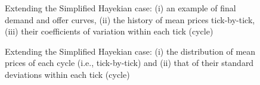 \documentclass[10pt]{report}
\begin{document}
\begin{appendices}
\begin{figure}[H]
\begin{center}
\caption{Extending the Simplified Hayekian case: (i) an example of final demand and offer curves, (ii) the history of mean prices tick-by-tick, (iii) their coefficients of variation within each tick (cycle)}
\label{output_3_2B2.png}
\end{center}
\end{figure}

\begin{figure}[H]
\begin{center}
\caption{Extending the Simplified Hayekian case: (i) the distribution of mean prices of each cycle (i.e., tick-by-tick) and (ii) that of their standard deviations within each tick (cycle)}
\label{output_3_3B2.png}
\end{center}
\end{figure}


\end{appendices}
\end{document}
